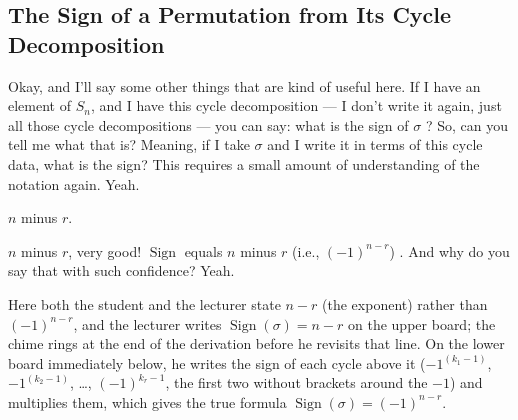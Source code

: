\subsection{The Sign of a Permutation from Its Cycle Decomposition}

\begin{speech}[00:40:06 - 00:40:42]
Okay, and I'll say some other things that are kind of useful here. If I have an element of $S_n$, and I have this cycle decomposition --- I don't write it again, just all those cycle decompositions --- you can say: what is the sign of $\sigma$ ? So, can you tell me what that is? Meaning, if I take $\sigma$ and I write it in terms of this cycle data, what is the sign? This requires a small amount of understanding of the notation again. Yeah.
\end{speech}

\begin{student}
$n$ minus $r$.
\end{student}

\begin{speech}[00:40:44 - 00:40:59]
$n$ minus $r$, very good! $\operatorname{Sign}$ equals $n$ minus $r$ (i.e., $(-1)^{n-r}$) . And why do you say that with such confidence? Yeah. 
\end{speech}

\begin{aiNote}
Here both the student and the lecturer state $n - r$ (the exponent) rather than $(-1)^{n-r}$, and the lecturer writes $\operatorname{Sign}(\sigma) = n - r$ on the upper board; the chime rings at the end of the derivation before he revisits that line. On the lower board immediately below, he writes the sign of each cycle above it ($-1^{(k_1 - 1)}$, $-1^{(k_2 - 1)}$, \dots, $(-1)^{k_r - 1}$, the first two without brackets around the $-1$) and multiplies them, which gives the true formula $\operatorname{Sign}(\sigma) = (-1)^{n-r}$.
\end{aiNote}

\begin{content}
\end{content}

